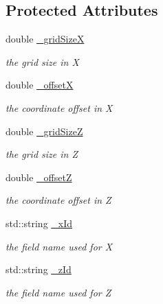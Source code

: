 \subsection*{Protected Attributes}
\begin{DoxyCompactItemize}
\item 
double \hyperlink{class_d_d4hep_1_1_d_d_segmentation_1_1_cartesian_grid_x_z_a1ecb47b3c00cafed8fae40bb9bca2180}{\+\_\+grid\+SizeX}
\begin{DoxyCompactList}\small\item\em the grid size in X \end{DoxyCompactList}\item 
double \hyperlink{class_d_d4hep_1_1_d_d_segmentation_1_1_cartesian_grid_x_z_aa6bb5820863cb39d75382042623e0b6c}{\+\_\+offsetX}
\begin{DoxyCompactList}\small\item\em the coordinate offset in X \end{DoxyCompactList}\item 
double \hyperlink{class_d_d4hep_1_1_d_d_segmentation_1_1_cartesian_grid_x_z_a7de343951b44cd52f5953f6f016d0e25}{\+\_\+grid\+SizeZ}
\begin{DoxyCompactList}\small\item\em the grid size in Z \end{DoxyCompactList}\item 
double \hyperlink{class_d_d4hep_1_1_d_d_segmentation_1_1_cartesian_grid_x_z_a2105d391f22a6e8f8d75b0ad85183c21}{\+\_\+offsetZ}
\begin{DoxyCompactList}\small\item\em the coordinate offset in Z \end{DoxyCompactList}\item 
std\+::string \hyperlink{class_d_d4hep_1_1_d_d_segmentation_1_1_cartesian_grid_x_z_a49e0f437dc9ab286e9d916dc85d8309a}{\+\_\+x\+Id}
\begin{DoxyCompactList}\small\item\em the field name used for X \end{DoxyCompactList}\item 
std\+::string \hyperlink{class_d_d4hep_1_1_d_d_segmentation_1_1_cartesian_grid_x_z_aa90fc4531dd5884afcc2c6c2a824ce18}{\+\_\+z\+Id}
\begin{DoxyCompactList}\small\item\em the field name used for Z \end{DoxyCompactList}\end{DoxyCompactItemize}
